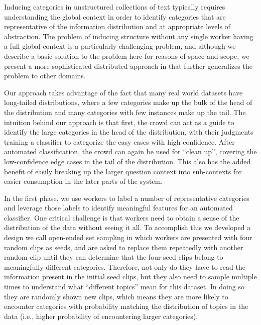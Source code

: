
Inducing categories in unstructured collections of text typically requires understanding the global context in order to identify categories that are representative of the information distribution and at appropriate levels of abstraction. The problem of inducing structure without any single worker having a full global context is a particularly challenging problem, and although we describe a basic solution to the problem here for reasons of space and scope, we present a more sophisticated distributed approach in \cite{alloy} that further generalizes the problem to other domains.

Our approach takes advantage of the fact that many real world datasets have long-tailed distributions, where a few categories make up the bulk of the head of the distribution and many categories with few instances make up the tail. The intuition behind our approach is that first, the crowd can act as a guide to identify the large categories in the head of the distribution, with their judgments training a classifier to categorize the easy cases with high confidence. After automated classification, the crowd can again be used for ``clean up'', covering the low-confidence edge cases in the tail of the distribution. This also has the added benefit of easily breaking up the larger question context into sub-contexts for easier consumption in the later parts of the system. 

In the first phase, we use workers to label a number of representative categories and leverage those labels to identify meaningful features for an automated classifier. One critical challenge is that workers need to obtain a sense of the distribution of the data without seeing it all. To accomplish this we developed a design we call open-ended set sampling in which workers are presented with four random clips as seeds, and are asked to replace them repeatedly with another random clip until they can determine that the four seed clips belong to meaningfully different categories. Therefore, not only do they have to read the information present in the initial seed clips, but they also need to sample multiple times to understand what ``different topics'' mean for this dataset. In doing so they are randomly shown new clips, which means they are more likely to encounter categories with probability matching the distribution of topics in the data (i.e., higher probability of encountering larger categories).

